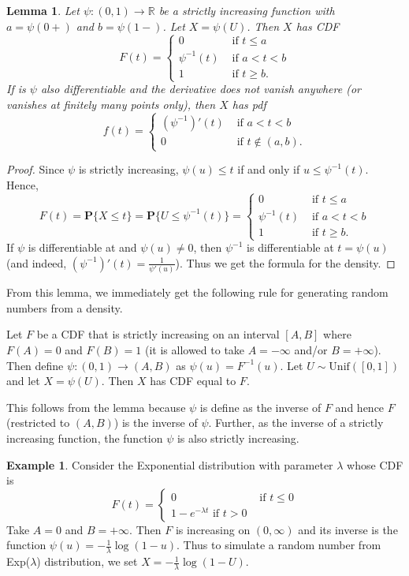 \documentclass[preprint,  11pt]{amsart}
\newcommand{\para}[1]{\vspace{4mm}\noindent{\bfseries #1:}}
\theoremstyle{plain} %
\newtheorem{lemma}[theorem]{Lemma}
\theoremstyle{definition} %
\newtheorem{example}[theorem]{Example}
\begin{document}
\begin{lemma} Let $\psi:(0,1)\rightarrow \mathbb{R}$ be a  strictly increasing function with $a=\psi(0+)$ and $b=\psi(1-)$. Let $X=\psi(U)$. Then $X$ has CDF 
$$
F(t)=\begin{cases} 0 & \mbox{ if }t\le a \\ \psi^{-1}(t) & \mbox{ if }a<t<b \\ 1 & \mbox{ if }t\ge b. \end{cases}
$$ 
If is $\psi$  also differentiable and the derivative does not vanish anywhere (or vanishes at finitely many points only), then $X$ has pdf 
$$
f(t)=\begin{cases} \left(\psi^{-1}\right)'(t) & \mbox{ if }a<t<b\\ 0 & \mbox{ if }t\not\in (a,b). \end{cases}
$$
\end{lemma}
\begin{proof} Since $\psi$ is strictly increasing, $\psi(u)\le t$ if and only if $u\le \psi^{-1}(t)$. Hence,
$$
F(t)=\mathbf{P}\{X\le t\} = \mathbf{P}\{U\le \psi^{-1}(t)\} = \begin{cases} 0 & \mbox{ if }t\le a \\ \psi^{-1}(t) & \mbox{ if }a<t<b \\ 1 & \mbox{ if }t\ge b. \end{cases}
$$
If $\psi$ is differentiable at and $\psi(u)\not=0$, then $\psi^{-1}$ is differentiable at $t=\psi(u)$ (and indeed, $(\psi^{-1})'(t)=\frac{1}{\psi'(u)}$). Thus we get the formula for the density.
\end{proof}

From this lemma, we immediately get the following rule for generating random numbers from a density. 

\para{How to simulate from a CDF} Let $F$ be a CDF that is strictly increasing on an interval $[A,B]$ where $F(A)=0$ and $F(B)=1$ (it is allowed to take $A=-\infty$ and/or $B=+\infty$). Then define $\psi:(0,1)\rightarrow (A,B)$ as $\psi(u)=F^{-1}(u)$. Let $U\sim \mbox{Unif}([0,1])$ and let $X=\psi(U)$. Then $X$ has CDF equal to $F$.

This follows from the lemma because $\psi$ is define as the inverse of $F$ and hence $F$ (restricted to $(A,B)$) is the inverse of $\psi$. Further, as the inverse of a strictly increasing function, the function $\psi$  is also strictly increasing.

\begin{example} Consider the Exponential distribution with parameter $\lambda$ whose CDF is 
$$
F(t)=\begin{cases} 0 & \mbox{ if }t\le 0 \\ 1-e^{-\lambda t} \mbox{ if }t>0 \end{cases}
$$ Take $A=0$ and $B=+\infty$. Then $F$ is increasing on $(0,\infty)$ and its inverse is the function $\psi(u)=-\frac{1}{\lambda}\log(1-u)$. Thus to simulate a random number from Exp($\lambda$) distribution, we set $X=-\frac{1}{\lambda}\log(1-U)$.
\end{example}
\end{document}
